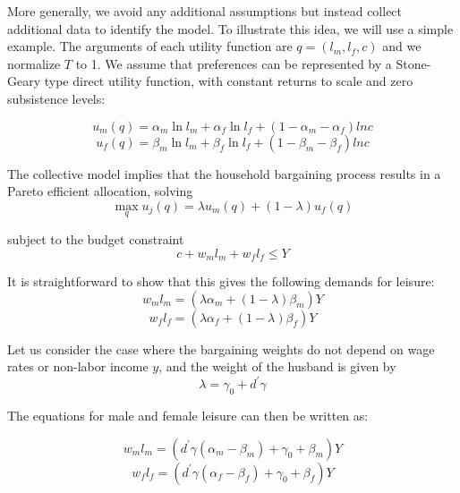 \documentclass[11pt,letter]{article}
\begin{document}
\par More generally, we avoid any additional assumptions but instead collect additional data to identify the model. To illustrate this idea, we will use a simple example. The arguments of each utility function are $q=(l_{m},l_{f}, c)$ and we normalize $T$ to 1. We assume that preferences can be represented by a Stone-Geary type direct utility function, with constant returns to scale and zero subsistence levels:

\begin{equation}
 u_{m}(q)=\alpha_{m}\ln l_{m}+\alpha_{f}\ln l_{f}+(1-\alpha_{m}-\alpha_{f})lnc
\end{equation}
\begin{equation}
 u_{f}(q)=\beta_{m}\ln l_{m}+\beta_{f}\ln l_{f}+(1-\beta_{m}-\beta_{f})lnc
\end{equation}

\par The collective model implies that the household bargaining process results in a Pareto efficient allocation, solving
\begin{equation}
\max _{q}  u_{j}(q)=\lambda u_m(q)+(1-\lambda) u_f(q)
\end{equation}
\par subject to the budget constraint
\begin{equation}
c + w_m l_m + w_f l_f \le Y
\end{equation}

It is straightforward to show that this gives the following demands for leisure:
\begin{equation}  \label{}
w_{m}l_{m}= (\lambda \alpha_m + (1-\lambda) \beta_m) Y
\end{equation}
\begin{equation}
w_{f}l_{f}= (\lambda \alpha_f +(1-\lambda) \beta_f) Y
\end{equation}

Let us consider the case where the bargaining weights do not depend on wage rates or non-labor income $y$, and the weight of the husband is given by
\begin{equation}
\lambda=\gamma_{0}+ d^\prime \gamma
\end{equation}

The equations for male and female leisure can then be written as:

\begin{equation}  \label{sg1}
w_{m}l_{m}= (d^\prime \gamma (\alpha_m - \beta_m) + \gamma_0 + \beta_m) Y
\end{equation}
\begin{equation} \label{sg2}
w_{f}l_{f}= (d^\prime \gamma (\alpha_f - \beta_f) + \gamma_0 + \beta_f) Y
\end{equation}
\end{document}
